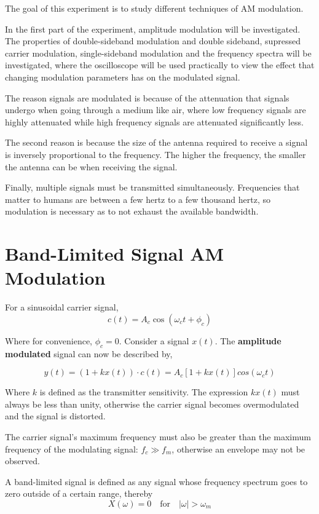 The goal of this experiment is to study different techniques of AM modulation.

In the first part of the experiment, amplitude modulation will be investigated. The properties of double-sideband modulation and double sideband, supressed carrier modulation, single-sideband modulation and the frequency spectra will be investigated, where the oscilloscope will be used practically to view the effect that changing modulation parameters has on the modulated signal.

The reason signals are modulated is because of the attenuation that signals undergo when going through a medium like air, where low frequency signals are highly attenuated while high frequency signals are attenuated significantly less.

The second reason is because the size of the antenna required to receive a signal is inversely proportional to the frequency. The higher the frequency, the smaller the antenna can be when receiving the signal.

Finally, multiple signals must be transmitted simultaneously. Frequencies that matter to humans are between a few hertz to a few thousand hertz, so modulation is necessary as to not exhaust the available bandwidth.

\section{Band-Limited Signal AM Modulation}
For a sinusoidal carrier signal,
\begin{equation}
    c(t) = A_c \cos(\omega_ct + \phi_c)
\end{equation}

Where for convenience, $\phi_c = 0$. Consider a signal $x(t)$. The {\bf amplitude modulated} signal can now be described by,

\begin{equation}
    y(t) = (1 + kx(t)) \cdot c(t) = A_c\left[1 + kx(t)\right]cos(\omega_ct)
\end{equation}

Where $k$ is defined as the transmitter sensitivity. The expression $kx(t)$ must always be less than unity, otherwise the carrier signal becomes overmodulated and the signal is distorted.

The carrier signal's maximum frequency must also be greater than the maximum frequency of the modulating signal: $f_c \gg f_m$, otherwise an envelope may not be observed.

A band-limited signal is defined as any signal whose frequency spectrum goes to zero outside of a certain range, thereby
\begin{equation}
    X(\omega) = 0 \quad \text{for} \quad |\omega| > \omega_m
\end{equation}

